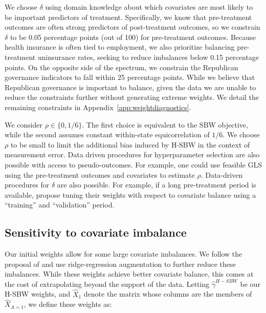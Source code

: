 \documentclass[aoas]{imsart}
\theoremstyle{plain}
\theoremstyle{remark}
\begin{document}
We choose $\delta$ using domain knowledge about which covariates are most likely to be important predictors of treatment. Specifically, we know that pre-treatment outcomes are often strong predictors of post-treatment outcomes, so we constrain $\delta$ to be 0.05 percentage points (out of 100) for pre-treatment outcomes. Because health insurance is often tied to employment, we also prioritize balancing pre-treatment uninsurance rates, seeking to reduce imbalances below 0.15 percentage points. On the opposite side of the spectrum, we constrain the Republican governance indicators to fall within 25 percentage points. While we believe that Republican governance is important to balance, given the data we are unable to reduce the constraints further without generating extreme weights. We detail the remaining constraints in Appendix~\ref{app:weightdiagnostics}. 

We consider $\rho \in \{0, 1/6\}$. The first choice is equivalent to the SBW objective, while the second assumes constant within-state equicorrelation of $1/6$. We choose $\rho$ to be small to limit the additional bias induced by H-SBW in the context of measurement error. Data driven procedures for hyperparameter selection are also possible with access to pseudo-outcomes. For example, one could use feasible GLS using the pre-treatment outcomes and covariates to estimate $\rho$. Data-driven procedures for $\delta$ are also possible. For example, if a long pre-treatment period is available, \cite{abadie2015comparative} propose tuning their weights with respect to covariate balance using a ``training'' and ``validation'' period.%

\subsection{Sensitivity to covariate imbalance}

Our initial weights allow for some large covariate imbalances. We follow the proposal of \cite{ben2021augmented} and use ridge-regression augmentation to further reduce these imbalances. While these weights achieve better covariate balance, this comes at the cost of extrapolating beyond the support of the data. Letting $\hat{\gamma}^{H-SBW}$ be our H-SBW weights, and $\hat{X}_1$ denote the matrix whose columns are the members of $\hat{X}_{A=1}$, we define these weights as:
\end{document}
